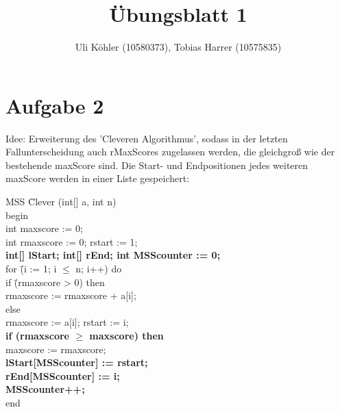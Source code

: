 \documentclass[a4paper,10pt]{article}
\title{Übungsblatt 1}
\author{Uli Köhler (10580373), Tobias Harrer (10575835)}
\begin{document}
\maketitle

\section{Aufgabe 2}
Idee: Erweiterung des 'Cleveren Algorithmus', sodass in der letzten Fallunterscheidung auch rMaxScores zugelassen werden,
die gleichgroß wie der bestehende maxScore sind. Die Start- und Endpositionen jedes weiteren maxScore werden in einer Liste gespeichert:
\newline
\begin{tabbing}
MSS \= Clever (int[] a, int n)\\
begin\\
\>int maxscore   := 0;\\
\>int rmaxscore  := 0; rstart := 1;\\
\>\textbf{int[] lStart; int[] rEnd; int MSScounter := 0;}\\
\>for \= (i := 1; i $\leq$ n; i++) do\\
\> \>if \=(rmaxscore > 0) then\\
\> \> \>rmaxscore := rmaxscore + a[i];\\
\> \> else \= \\
\> \> \>rmaxscore := a[i]; rstart := i;\\
\> \>\textbf{if (rmaxscore $\geq$ maxscore) then}\\
\> \> \> maxscore := rmaxscore; \\ \> \> \> \textbf{lStart[MSScounter] := rstart;}\\ \> \> \> \textbf{rEnd[MSScounter] := i;}\\
\> \> \>  \textbf{MSScounter++;}\\
end 
\end{tabbing}
\end{document}
